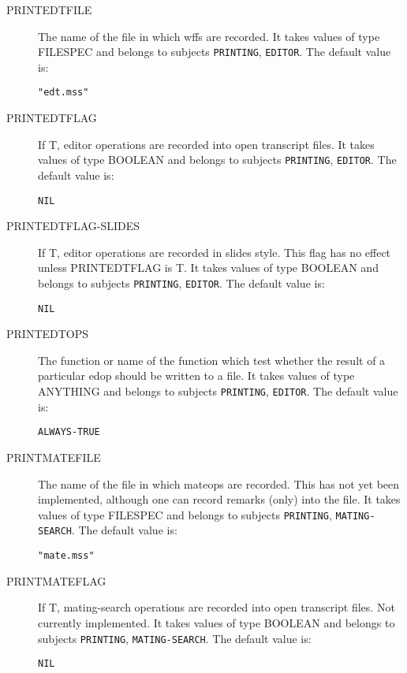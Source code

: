 \begin{description} 
\item[PRINTEDTFILE]  
The name of the file in which wffs are recorded.
It takes values of type FILESPEC and belongs to subjects \texttt{PRINTING}, \texttt{EDITOR}.  The default value is: \begin{lstlisting}
"edt.mss"
\end{lstlisting}

\item[PRINTEDTFLAG]  
If T, editor operations are recorded into open transcript files.
It takes values of type BOOLEAN and belongs to subjects \texttt{PRINTING}, \texttt{EDITOR}.  The default value is: \begin{lstlisting}
NIL
\end{lstlisting}

\item[PRINTEDTFLAG-SLIDES]  
If T, editor operations are recorded in slides style. This flag has 
no effect unless PRINTEDTFLAG is T.
It takes values of type BOOLEAN and belongs to subjects \texttt{PRINTING}, \texttt{EDITOR}.  The default value is: \begin{lstlisting}
NIL
\end{lstlisting}

\item[PRINTEDTOPS]  
The function or name of the function which test whether the
result of a particular edop should be written to a file.
It takes values of type ANYTHING and belongs to subjects \texttt{PRINTING}, \texttt{EDITOR}.  The default value is: \begin{lstlisting}
ALWAYS-TRUE
\end{lstlisting}

\item[PRINTMATEFILE]  
The name of the file in which mateops are recorded. This has not 
yet been implemented, although one can record remarks (only) into the 
file.
It takes values of type FILESPEC and belongs to subjects \texttt{PRINTING}, \texttt{MATING-SEARCH}.  The default value is: \begin{lstlisting}
"mate.mss"
\end{lstlisting}

\item[PRINTMATEFLAG]  
If T, mating-search operations are recorded into open transcript files.
Not currently implemented.
It takes values of type BOOLEAN and belongs to subjects \texttt{PRINTING}, \texttt{MATING-SEARCH}.  The default value is: \begin{lstlisting}
NIL
\end{lstlisting}


\end{description}
